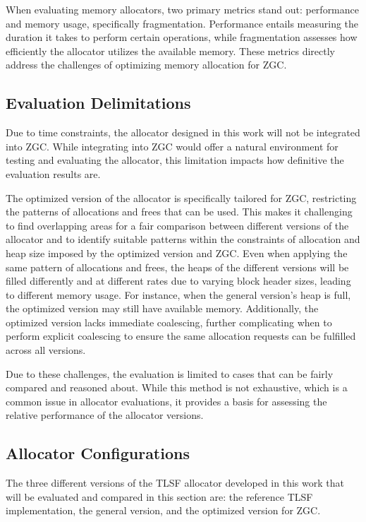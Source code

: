 
When evaluating memory allocators, two primary metrics stand out: performance and memory usage, specifically fragmentation. Performance entails measuring the duration it takes to perform certain operations, while fragmentation assesses how efficiently the allocator utilizes the available memory. These metrics directly address the challenges of optimizing memory allocation for ZGC.

\subsection{Evaluation Delimitations}

Due to time constraints, the allocator designed in this work will not be integrated into ZGC. While integrating into ZGC would offer a natural environment for testing and evaluating the allocator, this limitation impacts how definitive the evaluation results are.

The optimized version of the allocator is specifically tailored for ZGC, restricting the patterns of allocations and frees that can be used. This makes it challenging to find overlapping areas for a fair comparison between different versions of the allocator and to identify suitable patterns within the constraints of allocation and heap size imposed by the optimized version and ZGC. Even when applying the same pattern of allocations and frees, the heaps of the different versions will be filled differently and at different rates due to varying block header sizes, leading to different memory usage. For instance, when the general version's heap is full, the optimized version may still have available memory. Additionally, the optimized version lacks immediate coalescing, further complicating when to perform explicit coalescing to ensure the same allocation requests can be fulfilled across all versions.

Due to these challenges, the evaluation is limited to cases that can be fairly compared and reasoned about. While this method is not exhaustive, which is a common issue in allocator evaluations, it provides a basis for assessing the relative performance of the allocator versions.

\subsection{Allocator Configurations}

The three different versions of the TLSF allocator developed in this work that will be evaluated and compared in this section are: the reference TLSF implementation, the general version, and the optimized version for ZGC. 

